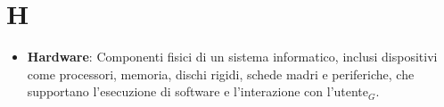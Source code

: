 \section{H}
\begin{itemize}
    \item \textbf{Hardware}: Componenti fisici di un sistema informatico, inclusi dispositivi come processori, memoria, dischi rigidi, schede madri e periferiche, che supportano l'esecuzione di software e l'interazione con l'utente$_G$.
\end{itemize}

